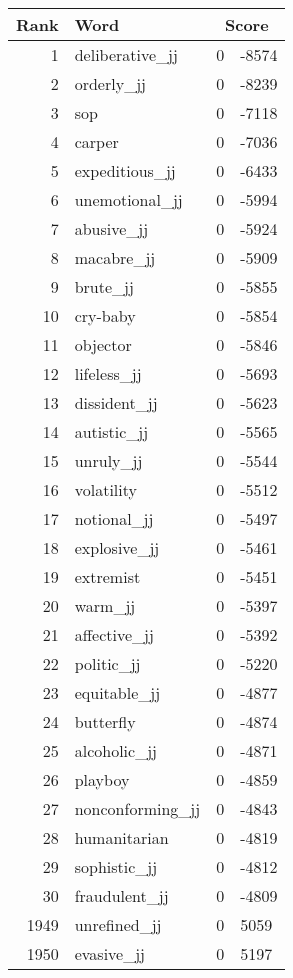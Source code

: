 \begin{longtable}[!htbp]{| rlr@{.}l |}
    \hline
    \textbf{Rank} & \textbf{Word} & \multicolumn{2}{c|}{\textbf{Score}} \\
    \hline
    \endhead
    1 & deliberative\_jj & 0 & -8574 \\
    2 & orderly\_jj & 0 & -8239 \\
    3 & sop & 0 & -7118 \\
    4 & carper & 0 & -7036 \\
    5 & expeditious\_jj & 0 & -6433 \\
    6 & unemotional\_jj & 0 & -5994 \\
    7 & abusive\_jj & 0 & -5924 \\
    8 & macabre\_jj & 0 & -5909 \\
    9 & brute\_jj & 0 & -5855 \\
    10 & cry-baby & 0 & -5854 \\
    11 & objector & 0 & -5846 \\
    12 & lifeless\_jj & 0 & -5693 \\
    13 & dissident\_jj & 0 & -5623 \\
    14 & autistic\_jj & 0 & -5565 \\
    15 & unruly\_jj & 0 & -5544 \\
    16 & volatility & 0 & -5512 \\
    17 & notional\_jj & 0 & -5497 \\
    18 & explosive\_jj & 0 & -5461 \\
    19 & extremist & 0 & -5451 \\
    20 & warm\_jj & 0 & -5397 \\
    21 & affective\_jj & 0 & -5392 \\
    22 & politic\_jj & 0 & -5220 \\
    23 & equitable\_jj & 0 & -4877 \\
    24 & butterfly & 0 & -4874 \\
    25 & alcoholic\_jj & 0 & -4871 \\
    26 & playboy & 0 & -4859 \\
    27 & nonconforming\_jj & 0 & -4843 \\
    28 & humanitarian & 0 & -4819 \\
    29 & sophistic\_jj & 0 & -4812 \\
    30 & fraudulent\_jj & 0 & -4809 \\
    1949 & unrefined\_jj & 0 & 5059 \\
    1950 & evasive\_jj & 0 & 5197 \\

\end{longtable}
